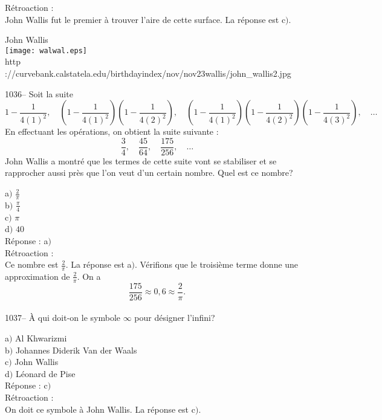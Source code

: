 ﻿\documentclass[letterpaper, 12pt]{article}
\begin{document}
R\'etroaction :\\
John Wallis fut le premier \`a trouver l'aire de cette surface.
La r\'eponse est c$)$.\\

        \begin{center}
        John Wallis\\
    \texttt{[image: walwal.eps]}\\
        {\footnotesize http
://curvebank.calstatela.edu/birthdayindex/nov/nov23wallis/john\_wallis2.jpg}
    \end{center}

1036-- Soit la suite
$$\displaystyle{1-\frac1{4(1)^2},\quad\left(1-\frac1{4(1)^2}\right)\left(1-\frac1{4(2)^2}\right),\quad
\left(1-\frac1{4(1)^2}\right)\left(1-\frac1{4(2)^2}\right)\left(1-\frac1{4(3)^2}\right),\quad\ldots}$$
En effectuant les op\'erations, on obtient la suite suivante :
$$\displaystyle{\frac34,\quad\frac{45}{64},\quad\frac{175}{256},\quad\ldots}$$
John Wallis a montr\'e que les termes de cette suite vont se
stabiliser et se rapprocher aussi pr\`es que l'on veut d'un certain
nombre. Quel est ce nombre?

a$)$ $\frac2{\pi}$ \\[2mm]
b$)$ $\frac{\pi}4$  \\[2mm]
c$)$ $\pi$  \\[2mm]
d$)$ $40$\\

R\'eponse : a$)$\\

R\'etroaction :\\
Ce nombre est $\frac2{\pi}$. La r\'eponse est a$)$. V\'erifions que
le troisi\`eme terme donne une approximation de $\frac2{\pi}$. On a
$$\displaystyle{\frac{175}{256}\approx0,6\approx\frac2{\pi}}.$$
\\

1037-- \`A qui doit-on le symbole $\infty$ pour d\'esigner l'infini?

a$)$ Al Khwarizmi \\
b$)$ Johannes Diderik Van der Waals   \\
c$)$ John Wallis  \\
d$)$ L\'eonard de Pise \\

R\'eponse : c$)$\\

R\'etroaction :\\
On doit ce symbole \`a John Wallis.
La r\'eponse est c$)$.\\
\end{document}
